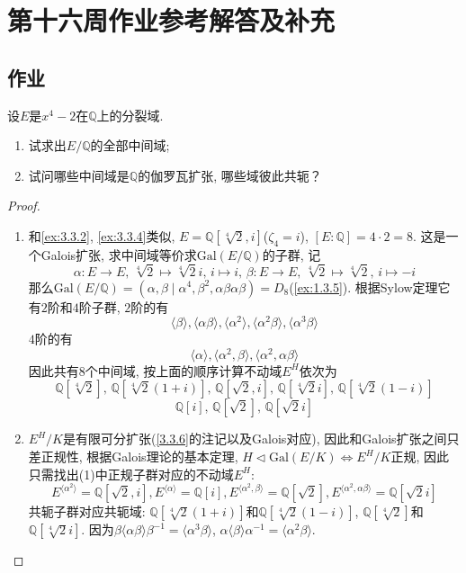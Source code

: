 \documentclass{../solutions-cn}
\begin{document}
\section*{第十六周作业参考解答及补充}

\subsection*{作业}

\begin{exercise}[习题4.4.1]
    设$E$是$x^4-2$在$\mathbb{Q}$上的分裂域.
    \begin{enumerate}[(1)]
        \item 试求出$E/\mathbb{Q}$的全部中间域;
        \item 试问哪些中间域是$\mathbb{Q}$的伽罗瓦扩张, 哪些域彼此共轭？
    \end{enumerate}
\end{exercise}

\begin{proof}
    \begin{enumerate}[(1)]
        \item 和\ref{ex:3.3.2}, \ref{ex:3.3.4}类似, $E = \mathbb{Q}[\sqrt[4]{2}, i]$($\zeta_4 = i$), $[E:\mathbb{Q}] = 4 \cdot 2 = 8$. 这是一个Galois扩张, 求中间域等价求$\mathrm{Gal}(E/\mathbb{Q})$的子群, 记
        \[
            \alpha:E \to E,\, \sqrt[4]{2} \mapsto \sqrt[4]{2}i,\, i \mapsto i,\, \beta:E \to E,\, \sqrt[4]{2} \mapsto \sqrt[4]{2},\, i \mapsto -i
        \]
        那么$\mathrm{Gal}(E/\mathbb{Q}) = (\alpha, \beta \mid \alpha^4, \beta^2, \alpha\beta\alpha\beta) = D_8$(\ref{ex:1.3.5}). 根据Sylow定理它有$2$阶和$4$阶子群, $2$阶的有
        \[
            \langle \beta \rangle, \langle \alpha\beta \rangle, \langle \alpha^2 \rangle, \langle \alpha^2\beta \rangle, \langle \alpha^3\beta \rangle
        \]
        $4$阶的有
        \[
            \langle \alpha \rangle, \langle \alpha^2, \beta \rangle, \langle \alpha^2, \alpha\beta \rangle
        \]
        因此共有$8$个中间域, 按上面的顺序计算不动域$E^H$依次为
        \[
            \mathbb{Q}[\sqrt[4]{2}],\, \mathbb{Q}[\sqrt[4]{2}(1 + i)],\, \mathbb{Q}[\sqrt{2}, i],\, \mathbb{Q}[\sqrt[4]{2}i],\, \mathbb{Q}[\sqrt[4]{2}(1 - i)]
        \]
        \[
            \mathbb{Q}[i],\, \mathbb{Q}[\sqrt{2}],\, \mathbb{Q}[\sqrt{2}i]
        \]
        \item $E^H/K$是有限可分扩张(\ref{3.3.6}的注记以及Galois对应), 因此和Galois扩张之间只差正规性, 根据Galois理论的基本定理, $H \lhd \mathrm{Gal}(E/K) \iff E^H/K$正规, 因此只需找出(1)中正规子群对应的不动域$E^H$:
        \[
            E^{\langle \alpha^2 \rangle} = \mathbb{Q}[\sqrt{2}, i], E^{\langle \alpha \rangle} = \mathbb{Q}[i], E^{\langle \alpha^2, \beta \rangle} = \mathbb{Q}[\sqrt{2}], E^{\langle \alpha^2, \alpha\beta \rangle} = \mathbb{Q}[\sqrt{2}i]
        \]
        共轭子群对应共轭域: $\mathbb{Q}[\sqrt[4]{2}(1 + i)]$和$\mathbb{Q}[\sqrt[4]{2}(1 - i)]$, $\mathbb{Q}[\sqrt[4]{2}]$和$\mathbb{Q}[\sqrt[4]{2}i]$. 因为$\beta\langle \alpha\beta \rangle\beta^{-1} = \langle \alpha^3\beta \rangle$, $\alpha\langle \beta \rangle\alpha^{-1} = \langle \alpha^2\beta \rangle$.
    \end{enumerate}
\end{proof}
\end{document}
